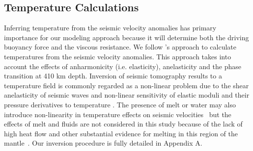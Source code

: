 \documentclass[draft,linenumbers]{agujournal2018}
\begin{document}
\subsection{Temperature Calculations} \label{temp_var}
    Inferring temperature from the seismic velocity anomalies has primary importance for our modeling approach because it will determine both the driving buoyancy force and the viscous resistance. We follow \citet{Cammarano2003}'s approach to calculate temperatures from the seismic velocity anomalies. This approach takes into account the effects of anharmonicity (i.e. elasticity), anelasticity and the phase transition at 410 km depth. Inversion of seismic tomography results to a temperature field is commonly regarded as a non-linear problem due to the shear anelasticity of seismic waves \citep{minster1981model, karato1993importance, sobolev1996upper, Goes_2000, artemieva2004shear} and non-linear sensitivity of elastic moduli and their pressure derivatives to temperature \citep{duffy1989seismic, anderson1992high, Cammarano2003, stixrude2005thermodynamics}. The presence of melt or water may also introduce non-linearity in temperature effects on seismic velocities~\citep{Karato_1998} but the effects of melt and fluids are not considered in this study because of the lack of high heat flow and other substantial evidence for melting in this region of the mantle~\citep{blackwell2006assessment}. Our inversion procedure is fully detailed in Appendix A.
%
    
\end{document}
